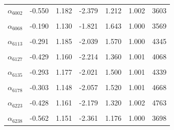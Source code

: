 \begin{longtable}{lrrrrrr}
$\alpha_{6002}$ & -0.550 & 1.182 & -2.379 & 1.212 & 1.002 & 3603\\
\cellcolor{gray!10}{$\alpha_{6055}$} & \cellcolor{gray!10}{0.054} & \cellcolor{gray!10}{1.230} & \cellcolor{gray!10}{-1.681} & \cellcolor{gray!10}{2.207} & \cellcolor{gray!10}{1.003} & \cellcolor{gray!10}{1541}\\
$\alpha_{6068}$ & -0.190 & 1.130 & -1.821 & 1.643 & 1.000 & 3569\\
\cellcolor{gray!10}{$\alpha_{6112}$} & \cellcolor{gray!10}{-0.289} & \cellcolor{gray!10}{1.177} & \cellcolor{gray!10}{-2.041} & \cellcolor{gray!10}{1.568} & \cellcolor{gray!10}{1.001} & \cellcolor{gray!10}{4319}\\
$\alpha_{6113}$ & -0.291 & 1.185 & -2.039 & 1.570 & 1.000 & 4345\\
\cellcolor{gray!10}{$\alpha_{6115}$} & \cellcolor{gray!10}{-0.242} & \cellcolor{gray!10}{1.140} & \cellcolor{gray!10}{-1.895} & \cellcolor{gray!10}{1.601} & \cellcolor{gray!10}{1.003} & \cellcolor{gray!10}{4276}\\
$\alpha_{6127}$ & -0.429 & 1.160 & -2.214 & 1.360 & 1.001 & 4068\\
\cellcolor{gray!10}{$\alpha_{6132}$} & \cellcolor{gray!10}{-0.322} & \cellcolor{gray!10}{1.203} & \cellcolor{gray!10}{-2.097} & \cellcolor{gray!10}{1.522} & \cellcolor{gray!10}{1.003} & \cellcolor{gray!10}{4221}\\
$\alpha_{6135}$ & -0.293 & 1.177 & -2.021 & 1.500 & 1.001 & 4339\\
\cellcolor{gray!10}{$\alpha_{6139}$} & \cellcolor{gray!10}{-0.699} & \cellcolor{gray!10}{1.204} & \cellcolor{gray!10}{-2.671} & \cellcolor{gray!10}{0.984} & \cellcolor{gray!10}{1.001} & \cellcolor{gray!10}{2744}\\
$\alpha_{6178}$ & -0.303 & 1.148 & -2.057 & 1.520 & 1.001 & 4668\\
\cellcolor{gray!10}{$\alpha_{6183}$} & \cellcolor{gray!10}{-0.341} & \cellcolor{gray!10}{1.150} & \cellcolor{gray!10}{-2.090} & \cellcolor{gray!10}{1.437} & \cellcolor{gray!10}{1.002} & \cellcolor{gray!10}{4326}\\
$\alpha_{6223}$ & -0.428 & 1.161 & -2.179 & 1.320 & 1.002 & 4763\\
\cellcolor{gray!10}{$\alpha_{6237}$} & \cellcolor{gray!10}{-0.493} & \cellcolor{gray!10}{1.162} & \cellcolor{gray!10}{-2.316} & \cellcolor{gray!10}{1.253} & \cellcolor{gray!10}{1.002} & \cellcolor{gray!10}{4431}\\
$\alpha_{6238}$ & -0.562 & 1.151 & -2.361 & 1.176 & 1.000 & 3698\\

\end{longtable}
